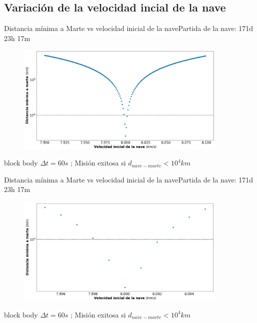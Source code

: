 \documentclass{beamer}
\begin{document}
        \subsection{Variación de la velocidad incial de la nave}

            \begin{frame}{Distancia mínima a Marte vs velocidad inicial de la nave}{Partida de la nave: 171d 23h 17m}
                \begin{figure}[H!]
                    \includegraphics[width=0.9\textwidth]{./min_distance_vs_v0_logaritmica_line_in_10^4_scatter}
                    \label{fig:marte_9}
                \end{figure}
                \begin{beamercolorbox}[sep=5pt,center]{block body}
                    \centering
                    \small{$\Delta t = 60s$ ; Misión exitosa si $d_{nave-marte} < 10^4 km$}
                \end{beamercolorbox}
            \end{frame}

            \begin{frame}{Distancia mínima a Marte vs velocidad inicial de la nave}{Partida de la nave: 171d 23h 17m}
                \begin{figure}[H!]
                    \includegraphics[width=0.9\textwidth]{./min_distance_vs_v0_logaritmica_line_in_10^4_reduced_scatter}
                    \label{fig:marte_10}
                \end{figure}
                \begin{beamercolorbox}[sep=5pt,center]{block body}
                    \centering
                    \small{$\Delta t = 60s$ ; Misión exitosa si $d_{nave-marte} < 10^4 km$}
                \end{beamercolorbox}
            \end{frame}
\end{document}
